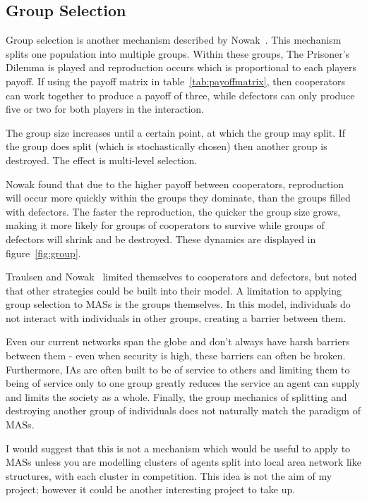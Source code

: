 \documentclass[]{final_report}
\begin{document}
\subsection{Group Selection}
\label{appendix:groupselection}
Group selection is another mechanism described by Nowak~\cite{five_rules_coop}. This mechanism splits one population into multiple groups. Within these groups, The Prisoner's Dilemma is played and reproduction occurs which is proportional to each players payoff. If using the payoff matrix in table~\ref{tab:payoffmatrix}, then cooperators can work together to produce a payoff of three, while defectors can only produce five or two for both players in the interaction.\par
The group size increases until a certain point, at which the group may split. If the group does split (which is stochastically chosen) then another group is destroyed. The effect is multi-level selection.\par
Nowak found that due to the higher payoff between cooperators, reproduction will occur more quickly within the groups they dominate, than the groups filled with defectors. The faster the reproduction, the quicker the group size grows, making it more likely for groups of cooperators to survive while groups of defectors will shrink and be destroyed. These dynamics are displayed in figure~\ref{fig:group}.\par
Traulsen and Nowak~\cite{multilevel_nowak} limited themselves to cooperators and defectors, but noted that other strategies could be built into their model. A limitation to applying group selection to MASs is the groups themselves. In this model, individuals do not interact with individuals in other groups, creating a barrier between them.\par
Even our current networks span the globe and don't always have harsh barriers between them - even when security is high, these barriers can often be broken. Furthermore, IAs are often built to be of service to others and limiting them to being of service only to one group greatly reduces the service an agent can supply and limits the society as a whole. Finally, the group mechanics of splitting and destroying another group of individuals does not naturally match the paradigm of MASs.\par
I would suggest that this is not a mechanism which would be useful to apply to MASs unless you are modelling clusters of agents split into local area network like structures, with each cluster in competition. This idea is not the aim of my project; however it could be another interesting project to take up.
\end{document}
